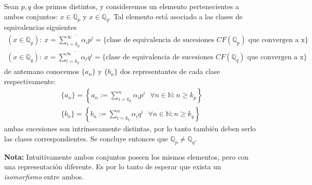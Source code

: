 \documentclass[spanish, fleqn]{article}
\begin{document}
Sean $p,q$ dos primos distintos, y consideremos un elemento pertenecientes a ambos conjuntos: $x \in \mathbb{Q}_p$ y $x \in \mathbb{Q}_q$. Tal elemento está asociado a las clases de equivalencias siguientes
\begin{align*}
    (x \in \mathbb{Q}_p):\  x = \overline{\sum_{i=k_p}^{\infty} \alpha_i p^i} =\{ \text{clase de equivalencia de sucesiones } CF(\mathbb{Q}_p)  \text{ que convergen a x} \} \\
    (x \in \mathbb{Q}_q):\  x = \overline{\sum_{i=k_q}^{\infty} \alpha_i q^i} =\{ \text{clase de equivalencia de sucesiones } CF(\mathbb{Q}_q)  \text{ que convergen a x} \}
\end{align*}
de antemano conocemos $\{a_n\}$ y $\{b_n\}$ dos representantes de cada clase respectivamente:
\begin{align*}
    \{a_n\} = \left\{ a_n := \sum_{i=k_p}^n \alpha_i p^i \ \ \ \forall n \in \mathbb{N}: n\geq k_p  \right\} \\
    \{b_n\} = \left\{ b_n := \sum_{i=k_q}^n \alpha_i q^i \ \ \ \forall n \in \mathbb{N}: n\geq k_q  \right\}      
\end{align*}  
ambas sucesiones son intrínsecamente distintas, por lo tanto también deben serlo las clases correspondientes. Se concluye entonces que $\mathbb{Q}_p \neq \mathbb{Q}_q$.

\textbf{Nota:} Intuitivamente ambos conjuntos poseen los mismos elementos, pero con una representación diferente. Es por lo tanto de esperar que exista un \textit{isomorfismo} entre ambos.
\end{document}
